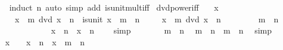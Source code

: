 \begin{isabellebody}
%
\isadelimproof
\ \ %
\endisadelimproof
%
\isatagproof
{}\isamarkupfalse%
\ {\isacharparenleft}{\kern0pt}induct\ n{\isacharparenright}{\kern0pt}\ {\isacharparenleft}{\kern0pt}auto\ simp\ add{\isacharcolon}{\kern0pt}\ is{\isacharunderscore}{\kern0pt}unit{\isacharunderscore}{\kern0pt}mult{\isacharunderscore}{\kern0pt}iff{\isacharparenright}{\kern0pt}%
\endisatagproof
{\isafoldproof}%
%
\isadelimproof
\isanewline
%
\endisadelimproof
\isanewline
{}\isamarkupfalse%
\ dvd{\isacharunderscore}{\kern0pt}power{\isacharunderscore}{\kern0pt}iff{\isacharcolon}{\kern0pt}\isanewline
\ \ \ {\isachardoublequoteopen}x\ {\isasymnoteq}\ {}{\isachardoublequoteclose}\isanewline
\ \ \ \ \ {\isachardoublequoteopen}x\ {\isacharcircum}{\kern0pt}\ m\ dvd\ x\ {\isacharcircum}{\kern0pt}\ n\ {\isasymlongleftrightarrow}\ is{\isacharunderscore}{\kern0pt}unit\ x\ {\isasymor}\ m\ {\isasymle}\ n{\isachardoublequoteclose}\isanewline
%
\isadelimproof
%
\endisadelimproof
%
\isatagproof
{}\isamarkupfalse%
\isanewline
\ \ \isamarkupfalse%
\ {\isacharasterisk}{\kern0pt}{\isacharcolon}{\kern0pt}\ {\isachardoublequoteopen}x\ {\isacharcircum}{\kern0pt}\ m\ dvd\ x\ {\isacharcircum}{\kern0pt}\ n{\isachardoublequoteclose}\isanewline
\ \ \isacommand{{\isacharbraceleft}{\kern0pt}}\isamarkupfalse%
\isanewline
\ \ \ \ \isamarkupfalse%
\ {\isachardoublequoteopen}m\ {\isachargreater}{\kern0pt}\ n{\isachardoublequoteclose}\isanewline
\ \ \ \ \isamarkupfalse%
\ {\isacharasterisk}{\kern0pt}\isanewline
\ \ \ \ \isamarkupfalse%
\ \isamarkupfalse%
\ {\isachardoublequoteopen}x\ {\isacharcircum}{\kern0pt}\ n\ {\isacharequal}{\kern0pt}\ x\ {\isacharcircum}{\kern0pt}\ n\ {\isacharasterisk}{\kern0pt}\ {}{\isachardoublequoteclose}\ \isamarkupfalse%
\ simp\isanewline
\ \ \ \ \isamarkupfalse%
\ \isamarkupfalse%
\ {\isacartoucheopen}m\ {\isachargreater}{\kern0pt}\ n{\isacartoucheclose}\ \isamarkupfalse%
\ {\isachardoublequoteopen}m\ {\isacharequal}{\kern0pt}\ n\ {\isacharplus}{\kern0pt}\ {\isacharparenleft}{\kern0pt}m\ {\isacharminus}{\kern0pt}\ n{\isacharparenright}{\kern0pt}{\isachardoublequoteclose}\ \isamarkupfalse%
\ simp\isanewline
\ \ \ \ \isamarkupfalse%
\ \isamarkupfalse%
\ {\isachardoublequoteopen}x\ {\isacharcircum}{\kern0pt}\ {\isasymdots}\ {\isacharequal}{\kern0pt}\ x\ {\isacharcircum}{\kern0pt}\ n\ {\isacharasterisk}{\kern0pt}\ x\ {\isacharcircum}{\kern0pt}\ {\isacharparenleft}{\kern0pt}m\ {\isacharminus}{\kern0pt}\ n{\isacharparenright}{\kern0pt}{\isachardoublequoteclose}\ \isamarkupfalse%

\end{isabellebody}
